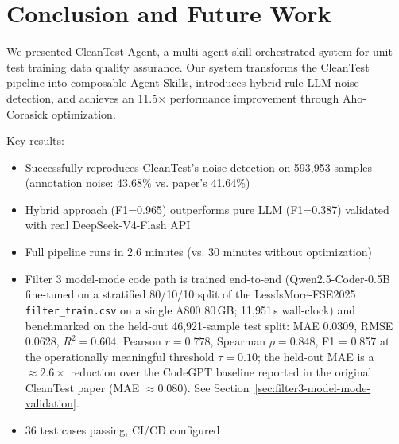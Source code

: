 \documentclass[acmlarge,nonacm,screen]{acmart}
\begin{document}
\section{Conclusion and Future Work}
\label{sec:conclusion}

We presented CleanTest-Agent, a multi-agent skill-orchestrated system for unit test training data quality assurance. Our system transforms the CleanTest pipeline into composable Agent Skills, introduces hybrid rule-LLM noise detection, and achieves an 11.5$\times$ performance improvement through Aho-Corasick optimization.

Key results:
\begin{itemize}
    \item Successfully reproduces CleanTest's noise detection on 593,953 samples (annotation noise: 43.68\% vs. paper's 41.64\%)
    \item Hybrid approach (F1=0.965) outperforms pure LLM (F1=0.387) validated with real DeepSeek-V4-Flash API
    \item Full pipeline runs in 2.6 minutes (vs. 30 minutes without optimization)
    \item Filter 3 model-mode code path is trained end-to-end (Qwen2.5-Coder-0.5B fine-tuned on a stratified 80/10/10 split of the LessIsMore-FSE2025 \texttt{filter\_train.csv} on a single A800 80\,GB; 11{,}951\,s wall-clock) and benchmarked on the held-out 46{,}921-sample test split: MAE 0.0309, RMSE 0.0628, $R^2 = 0.604$, Pearson $r = 0.778$, Spearman $\rho = 0.848$, F1 = 0.857 at the operationally meaningful threshold $\tau = 0.10$; the held-out MAE is a $\approx 2.6\times$ reduction over the CodeGPT baseline reported in the original CleanTest paper (MAE $\approx 0.080$). See Section~\ref{sec:filter3-model-mode-validation}.
    \item 36 test cases passing, CI/CD configured
\end{itemize}
\end{document}
